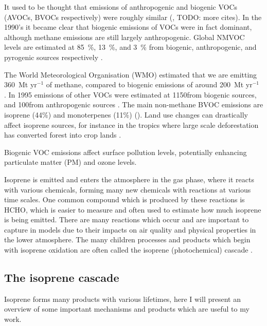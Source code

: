     It used to be thought that emissions of anthropogenic and biogenic VOCs (AVOCs, BVOCs respectively) were roughly similar (\cite{Muller1992}, TODO: more cites).
    In the 1990's it became clear that biogenic emissions of VOCs were in fact dominant, although methane emissions are still largely anthropogenic. 
    Global NMVOC levels are estimated at 85~\%, 13~\%, and 3~\% from biogenic, anthropogenic, and pyrogenic sources respectively \citep{Kanakidou2005, Kefauver2014}.
    
    The World Meteorological Organisation (WMO) estimated that we are emitting 360~Mt yr$^{-1}$ of methane, compared to biogenic emissions of around 200~Mt yr$^{-1}$ \citep{Atkinson2000}.
    In 1995 emissions of other VOCs were estimated at 1150\tgcpyr from biogenic sources, and 100\tgcpyr from anthropogenic sources \citep{Guenther1995, Atkinson2000}.
    The main non-methane BVOC emissions are isoprene (44\%) and monoterpenes (11\%) (\cite{Guenther2000, Kefauver2014}). 
    Land use changes can drastically affect isoprene sources, for instance in the tropics where large scale deforestation has converted forest into crop lands \citep{Kanakidou2005}.

    Biogenic VOC emissions affect surface pollution levels, potentially enhancing particulate matter (PM) and ozone levels.
    
    
    Isoprene is emitted and enters the atmosphere in the gas phase, where it reacts with various chemicals, forming many new chemicals with reactions at various time scales.
    One common compound which is produced by these reactions is HCHO, which is easier to measure and often used to estimate how much isoprene is being emitted.
    There are many reactions which occur and are important to capture in models due to their impacts on air quality and physical properties in the lower atmosphere.
    The many children processes and products which begin with isoprene oxidation are often called the isoprene (photochemical) cascade \cite{Crounse2012,Paulot2012,Wolfe2016}.
    
  \subsection{The isoprene cascade}
    \label{LR:VOCs:IsopCascade}
    
    Isoprene forms many products with various lifetimes, here I will present an overview of some important mechanisms and products which are useful to my work.
    
